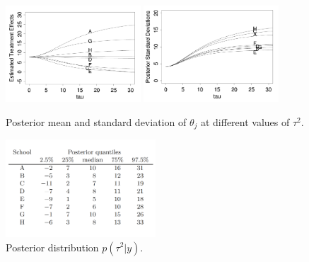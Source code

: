 \documentclass{harvardml}
\theoremstyle{definition}
\theoremstyle{plain}
\begin{document}
\begin{figure}[!hbt]
\center
\includegraphics[width=0.45\textwidth]{8school_post_mean.pdf}
\includegraphics[width=0.45\textwidth]{8school_post_sd.pdf}
\caption{Posterior mean and standard deviation of $\theta_j$ at different values of $\tau^2$.}
\end{figure}

\begin{figure}[!hbt]
\center
\includegraphics[width=0.5\textwidth]{8school_post_table.pdf}
\caption{Posterior distribution $p(\tau^2|y)$.}
\end{figure}
\end{document}

